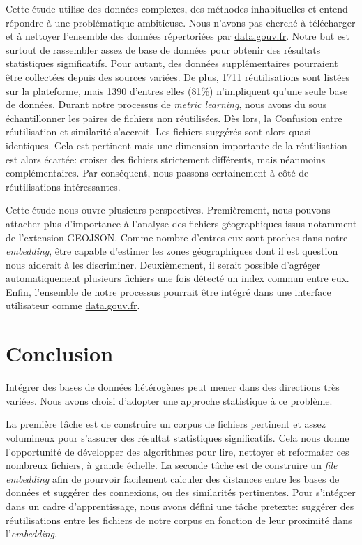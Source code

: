 \documentclass[a4paper]{article}
\begin{document}
	Cette étude utilise des données complexes, des méthodes inhabituelles et entend répondre à une problématique ambitieuse. Nous n'avons pas cherché à télécharger et à nettoyer l'ensemble des données répertoriées par \href{http://www.data.gouv.fr/fr/}{data.gouv.fr}. Notre but est surtout de rassembler assez de base de données pour obtenir des résultats statistiques significatifs. Pour autant, des données supplémentaires pourraient être collectées depuis des sources variées. De plus, 1711 réutilisations sont listées sur la plateforme, mais 1390 d'entres elles (81\%) n'impliquent qu'une seule base de données. Durant notre processus de \emph{metric learning}, nous avons du sous échantillonner les paires de fichiers non réutilisées. Dès lors, la Confusion entre réutilisation et similarité s'accroit. Les fichiers suggérés sont alors quasi identiques. Cela est pertinent mais une dimension importante de la réutilisation est alors écartée: croiser des fichiers strictement différents, mais néanmoins complémentaires. Par conséquent, nous passons certainement à côté de réutilisations intéressantes. 
	
	Cette étude nous ouvre plusieurs perspectives. Premièrement, nous pouvons attacher plus d'importance à l'analyse des fichiers géographiques issus notamment de l'extension GEOJSON. Comme nombre d'entres eux sont proches dans notre \emph{embedding}, être capable d'estimer les zones géographiques dont il est question nous aiderait à les discriminer. Deuxièmement, il serait possible d'agréger automatiquement plusieurs fichiers une fois détecté un index commun entre eux. Enfin, l'ensemble de notre processus pourrait être intégré dans une interface utilisateur comme \href{http://www.data.gouv.fr/fr/}{data.gouv.fr}.
	
	\section{Conclusion}	
	
	Intégrer des bases de données hétérogènes peut mener dans des directions très variées. Nous avons choisi d'adopter une approche statistique à ce problème.

	La première tâche est de construire un corpus de fichiers pertinent et assez volumineux pour s'assurer des résultat statistiques significatifs. Cela nous donne l'opportunité de développer des algorithmes pour lire, nettoyer et reformater ces nombreux fichiers, à grande échelle. La seconde tâche est de construire un \emph{file embedding} afin de pourvoir facilement calculer des distances entre les bases de données et suggérer des connexions, ou des similarités pertinentes. Pour s'intégrer dans un cadre d'apprentissage, nous avons défini une tâche pretexte: suggérer des réutilisations entre les fichiers de notre corpus en fonction de leur proximité dans l'\emph{embedding}.
	
	
	
	
\end{document}
